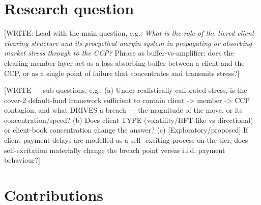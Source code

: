 \section{Research question}
\label{sec:intro-rq}

[WRITE: Lead with the main question, e.g.: \emph{What is the role of the tiered
client-clearing structure and its procyclical margin system in propagating or
absorbing market stress through to the CCP?} Phrase as buffer-vs-amplifier: does the
clearing-member layer act as a loss-absorbing buffer between a client and the CCP,
or as a single point of failure that concentrates and transmits stress?]

[WRITE — sub-questions, e.g.:
  (a) Under realistically calibrated stress, is the cover-2 default-fund framework
      sufficient to contain client -> member -> CCP contagion, and what DRIVES a
      breach — the magnitude of the move, or its concentration/speed?
  (b) Does client TYPE (volatility/HFT-like vs directional) or client-book
      concentration change the answer?
  (c) [Exploratory/proposed] If client payment delays are modelled as a self-
      exciting process on the tier, does self-excitation materially change the
      breach point versus i.i.d. payment behaviour?]

\section{Contributions}
\label{sec:intro-contributions}


